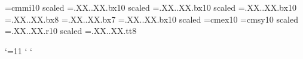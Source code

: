 %
%
%
\def\wordsplita#1#2#3.XX.{#1}%
\def\wordsplitb#1#2#3.XX.{#2}%
\rm
\edef\fonthdg{\expandafter\wordsplita\fontname\the\font.XX.}%
\edef\fonthdge{\expandafter\wordsplitb\fontname\the\font.XX.}%
\font\cmmi=cmmi10 scaled 
\font\cmbxbig=\fonthdg\fonthdge bx10 scaled 
\font\cmbx=\fonthdg\fonthdge bx10 scaled 
\font\cmbxsmall=\fonthdg\fonthdge bx10 
\font\cmbxtiny=\fonthdg\fonthdge bx8
\font\cmbxmicro=\fonthdg\fonthdge bx7
\font\moyen=\fonthdg\fonthdge bx10 scaled 
\font\cmex=cmex10
\font\cmsy=cmsy10 scaled 
\font\cmr=\fonthdg\fonthdge r10 scaled 
\font\ttyeight=\fonthdg\fonthdge tt8


\edef\catcodeat{\the\catcode`\@}\catcode`\@=11
\edef\catcode@gt{\the\catcode`\>}\catcode`
\edef\catcode@lt{\the\catcode`\<}\catcode`

